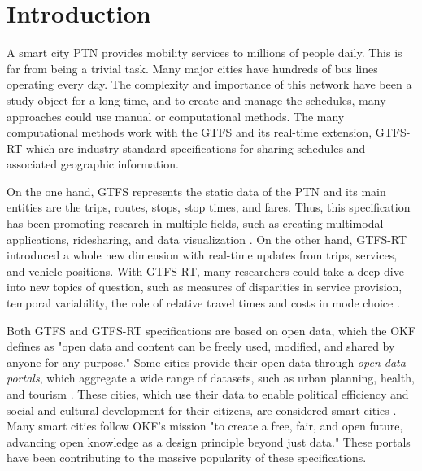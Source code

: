 \chapter{Introduction}
\label{cap1}

\vspace{-1.9cm}


A smart city \ac{PTN} provides mobility services to
millions of people daily. This is far from being a trivial task. Many major cities have hundreds of bus lines operating every day.
The complexity and importance of this network
have been a study object for a long time, and to create and 
manage the schedules, many approaches could use
manual or computational methods. 
The many computational 
methods work with the \ac{GTFS} \cite{GTFS}
and its real-time extension, 
\ac{GTFS-RT} \cite{GTFS-RT}
which are industry standard specifications for sharing schedules and
associated geographic information.

On the one hand, GTFS represents the static data of the PTN and its 
main entities are the trips, routes, stops, stop times, and fares. 
Thus, this specification has been promoting research in multiple fields, 
such as creating multimodal applications, 
ridesharing, and data visualization 
\cite{GTFSExemples}.
On the other hand, GTFS-RT introduced
a whole new dimension with real-time updates from trips,
services, and vehicle positions. With GTFS-RT,
many researchers could take a deep dive into 
new topics of question, such as measures of disparities in service provision, temporal
variability, the role of relative travel times and costs in mode choice
\cite{GTFS-RT_delays_2017, GTFS-RT_delays_2022, GTFS-RT_delays_2022-ADWIN}.

Both GTFS and GTFS-RT specifications are based on open data, which
the \ac{OKF} \cite{okf} defines as
"open data and content can be freely used, modified, 
and shared by anyone for any purpose." Some cities provide
their open data through {\em open data portals}, which aggregate
a wide range of
datasets, such as urban planning, health, and tourism \cite{opendata}.
These cities, which use their data to enable political efficiency and social and 
cultural development for their citizens, are considered smart cities \cite{smart_cities_SLR}.
Many smart cities follow OKF's mission "to create a free, fair, and open future, advancing open knowledge 
as a design principle beyond just data." These portals have been contributing
to the massive popularity of these specifications.

